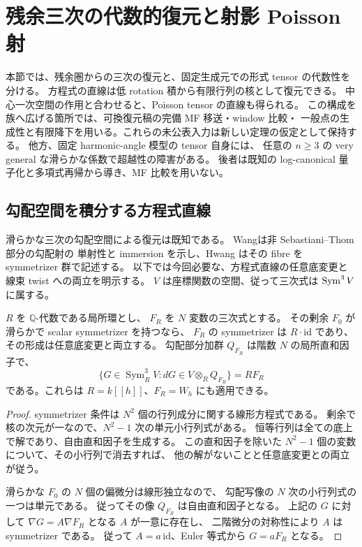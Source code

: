 \section{残余三次の代数的復元と射影 Poisson 射}
\label{sec:nfm-residual-algebraic}

本節では、残余圏からの三次の復元と、固定生成元での形式 tensor の代数性を分ける。
方程式の直線は低 rotation 積から有限行列の核として復元できる。
中心一次空間の作用と合わせると、Poisson tensor の直線も得られる。
この構成を族へ広げる箇所では、可換復元稿の完備 MF 移送・window 比較・
一般点の生成性と有限降下を用いる。これらの未公表入力は新しい定理の仮定として保持する。
他方、固定 harmonic-angle 模型の tensor 自身には、
任意の $n\ge3$ の very general な滑らかな係数で超越性の障害がある。
後者は既知の log-canonical 量子化と多項式再帰から導き、MF 比較を用いない。

\subsection{勾配空間を積分する方程式直線}

滑らかな三次の勾配空間による復元は既知である。
Wang\cite[Theorem~3.3]{NFMWangMilnor}は非 Sebastiani--Thom 部分の勾配射の
単射性と immersion を示し、Hwang\cite[Theorems~1.5, 1.6; Proposition~2.6]{NFMHwangSymmetrizer}
はその fibre を symmetrizer 群で記述する。
以下では今回必要な、方程式直線の任意底変更と線束 twist への両立を明示する。
$V$ は座標関数の空間、従って三次式は $\operatorname{Sym}^3V$ に属する。

\begin{lemma}
\label{lem:nfm-scalar-symmetrizer-local}
$R$ を $\mathbb Q$-代数である局所環とし、
$F_R$ を $N$ 変数の三次式とする。
その剰余 $F_0$ が滑らかで scalar symmetrizer を持つなら、
$F_R$ の symmetrizer は $R\cdot\mathrm{id}$ であり、その形成は任意底変更と両立する。
勾配部分加群 $Q_{F_R}$ は階数 $N$ の局所直和因子で、
\[
 \{G\in\operatorname{Sym}^3_RV:
                  dG\in V\otimes_RQ_{F_R}\}=R F_R
\]
である。これらは $R=k[[h]]$、$F_R=W_h$ にも適用できる。
\end{lemma}

\begin{proof}
symmetrizer 条件は $N^2$ 個の行列成分に関する線形方程式である。
剰余で核の次元が一なので、$N^2-1$ 次の単元小行列式がある。
恒等行列は全ての底上で解であり、自由直和因子を生成する。
この直和因子を除いた $N^2-1$ 個の変数について、その小行列で消去すれば、
他の解がないことと任意底変更との両立が従う。

滑らかな $F_0$ の $N$ 個の偏微分は線形独立なので、
勾配写像の $N$ 次の小行列式の一つは単元である。
従ってその像 $Q_{F_R}$ は自由直和因子となる。
上記の $G$ に対して $\nabla G=A\nabla F_R$ となる $A$ が一意に存在し、
二階微分の対称性により $A$ は symmetrizer である。
従って $A=a\,\mathrm{id}$、Euler 等式から $G=aF_R$ となる。
\end{proof}

